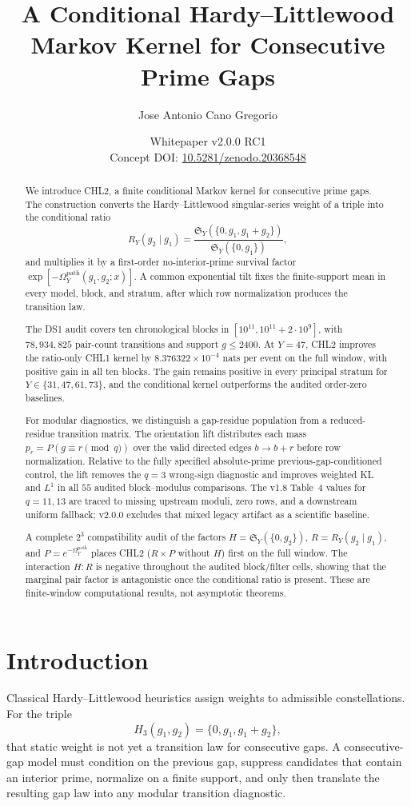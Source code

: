 \documentclass[10pt]{article}
\title{A Conditional Hardy--Littlewood Markov Kernel for Consecutive Prime Gaps}
\author{Jose Antonio Cano Gregorio}
\date{Whitepaper v2.0.0 RC1\\\small Concept DOI: \href{https://doi.org/10.5281/zenodo.20368548}{10.5281/zenodo.20368548}}
\newcommand{\SY}{\mathfrak{S}_Y}
\begin{document}
\maketitle
\begin{abstract}
We introduce CHL2, a finite conditional Markov kernel for consecutive prime gaps.  The construction converts the Hardy--Littlewood singular-series weight of a triple into the conditional ratio
\[
R_Y(g_2\mid g_1)=\frac{\SY(\{0,g_1,g_1+g_2\})}{\SY(\{0,g_1\})},
\]
and multiplies it by a first-order no-interior-prime survival factor $\exp[-\Omega_Y^{\mathrm{path}}(g_1,g_2;x)]$.  A common exponential tilt fixes the finite-support mean in every model, block, and stratum, after which row normalization produces the transition law.

The DS1 audit covers ten chronological blocks in $[10^{11},10^{11}+2\cdot10^9]$, with $78{,}934{,}825$ pair-count transitions and support $g\le2400$.  At $Y=47$, CHL2 improves the ratio-only CHL1 kernel by $8.376322\times10^{-4}$ nats per event on the full window, with positive gain in all ten blocks.  The gain remains positive in every principal stratum for $Y\in\{31,47,61,73\}$, and the conditional kernel outperforms the audited order-zero baselines.

For modular diagnostics, we distinguish a gap-residue population from a reduced-residue transition matrix.  The orientation lift distributes each mass $p_r=P(g\equiv r\pmod q)$ over the valid directed edges $b\to b+r$ before row normalization.  Relative to the fully specified absolute-prime previous-gap-conditioned control, the lift removes the $q=3$ wrong-sign diagnostic and improves weighted KL and $L^1$ in all $55$ audited block--modulus comparisons.  The v1.8 Table~4 values for $q=11,13$ are traced to missing upstream moduli, zero rows, and a downstream uniform fallback; v2.0.0 excludes that mixed legacy artifact as a scientific baseline.

A complete $2^3$ compatibility audit of the factors $H=\SY(\{0,g_2\})$, $R=R_Y(g_2\mid g_1)$, and $P=e^{-\Omega_Y^{\mathrm{path}}}$ places CHL2 ($R\times P$ without $H$) first on the full window.  The interaction $H{:}R$ is negative throughout the audited block/filter cells, showing that the marginal pair factor is antagonistic once the conditional ratio is present.  These are finite-window computational results, not asymptotic theorems.
\end{abstract}
\tableofcontents
\listoftables
\listoffigures
\newpage

\section{Introduction}
Classical Hardy--Littlewood heuristics assign weights to admissible constellations.  For the triple
\[
H_3(g_1,g_2)=\{0,g_1,g_1+g_2\},
\]
that static weight is not yet a transition law for consecutive gaps.  A consecutive-gap model must condition on the previous gap, suppress candidates that contain an interior prime, normalize on a finite support, and only then translate the resulting gap law into any modular transition diagnostic.
\end{document}
